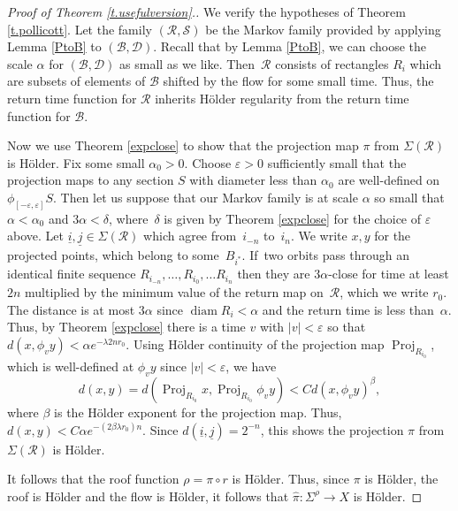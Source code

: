 \documentclass[10pt]{amsart}
\let\mathcal\mathscr
\let\epsilon\varepsilon
\theoremstyle{definition}
\numberwithin{equation}{section}
\DeclareMathOperator{\diam}{diam}
\DeclareMathOperator{\Proj}{Proj}
\newcommand\DDD{\mathcal D}
\newcommand\BBB{\mathcal B}
\newcommand\RRR{\mathcal R}
\newcommand\SSS{\mathcal S}
\begin{document}
\begin{proof}[Proof of Theorem \ref{t.usefulversion}.]

We verify the hypotheses of Theorem \ref{t.pollicott}. Let the family $(\RRR, \SSS)$ be the Markov family provided by applying Lemma \ref{PtoB} to $(\BBB, \DDD)$. Recall that by Lemma \ref{PtoB}, we can choose the scale $\alpha$ for $(\BBB, \DDD)$ as small as we like. Then~$\RRR$ consists of rectangles $R_i$ which are subsets of elements of $\BBB$ shifted by the flow for some small time. Thus, the return time function for $\RRR$ inherits Hölder regularity from the return time function for $\BBB$.

Now we use Theorem \ref{expclose} to show that the projection map $\pi$ from $\Sigma(\RRR)$ is Hölder. Fix some small $\alpha_0>0$. Choose $\epsilon>0$ sufficiently small that the projection maps to any section $S$ with diameter less than $\alpha_0$ are well-defined on $\phi_{[-\epsilon,\epsilon]}S$. Then let us suppose that our Markov family is at scale $\alpha$ so small that $\alpha<\alpha_0$ and $3\alpha < \delta$, where~$\delta$ is given by Theorem \ref{expclose} for the choice of $\epsilon$ above. Let $\underline i, \underline j \in \Sigma(\RRR)$ which agree from~$i_{-n}$ to~$i_n$. We write $x, y$ for the projected points, which belong to some~$B_{i^*}$. If~two orbits pass through an identical finite sequence $R_{i_{-n}}, \ldots, R_{i_0}, \ldots R_{i_n}$ then they are $3\alpha$-close for time at least $2n$ multiplied by the minimum value of the return map on~$\RRR$, which we write $r_0$. The distance is at most $3 \alpha$ since $\diam R_i < \alpha$ and the return time is less than~$\alpha$. Thus, by Theorem \ref{expclose} there is a time $v$ with $|v|<\epsilon$ so that $d(x, \phi_v y)< \alpha e^{-\lambda 2nr_0}$. Using Hölder continuity of the projection map $\Proj_{R_{i_0}}$, which is well-defined at $\phi_vy$ since $|v|<\epsilon$, we have
\[
d(x,y) = d(\Proj_{R_{i_0}}x, \Proj_{R_{i_0}}\phi_v y)< Cd(x, \phi_vy)^\beta,
\]
where $\beta$ is the Hölder exponent for the projection map. Thus, $d(x,y) < C\alpha e^{-(2\beta \lambda r_0) n}$. Since $d(\underline i, \underline j) = 2^{-n}$, this shows the projection $\pi$ from $\Sigma(\RRR)$ is Hölder.

It follows that the roof function $\rho = \pi \circ r$ is Hölder. Thus, since $\pi$ is Hölder, the roof is Hölder and the flow is Hölder, it follows that $\hat \pi: \Sigma^\rho \to X$ is Hölder.
\end{proof}
\end{document}
